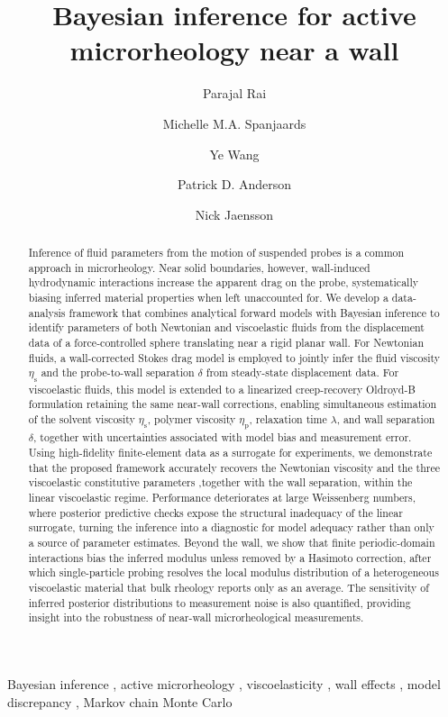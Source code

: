 \documentclass{elsarticle}
\begin{document}
\begin{frontmatter}

\title{Bayesian inference for active microrheology near a wall}

\author[1]{Parajal Rai}
\author[1]{Michelle M.A. Spanjaards}
\author[1]{Ye Wang}
\author[1]{Patrick D. Anderson}
\author[1]{Nick Jaensson}
\address[1]{Department of Mechanical Engineering,
            Eindhoven University of Technology,
            5600 MB Eindhoven, The Netherlands}


\begin{abstract}
Inference of fluid parameters from the motion of suspended probes is a
common approach in microrheology. Near solid boundaries, however,
wall-induced hydrodynamic interactions increase the apparent drag on the
probe, systematically biasing inferred material properties when left
unaccounted for. We develop a data-analysis framework that combines
analytical forward models with Bayesian inference to identify parameters
of both Newtonian and viscoelastic fluids from the displacement data of a
force-controlled sphere translating near a rigid planar wall. For
Newtonian fluids, a wall-corrected Stokes drag model is employed to
jointly infer the fluid viscosity $\eta_{\mathrm{s}}$ and the
probe-to-wall separation $\delta$ from steady-state displacement data.
For viscoelastic fluids, this model is extended to a linearized
creep-recovery Oldroyd-B formulation retaining the same near-wall
corrections, enabling simultaneous estimation of the solvent viscosity
$\eta_{\mathrm{s}}$, polymer viscosity $\eta_{\mathrm{p}}$, relaxation
time $\lambda$, and wall separation $\delta$, together with
uncertainties associated with model bias and measurement error. Using
high-fidelity finite-element data as a surrogate for experiments, we
demonstrate that the proposed framework accurately recovers the
Newtonian viscosity and the three viscoelastic constitutive parameters
,together with the wall separation, within the linear viscoelastic regime. Performance
deteriorates at large Weissenberg numbers, where posterior
predictive checks expose the structural inadequacy of the linear
surrogate, turning the inference into a diagnostic for model adequacy
rather than only a source of parameter estimates. Beyond the wall, we
show that finite periodic-domain interactions bias the inferred modulus
unless removed by a Hasimoto correction, after which single-particle
probing resolves the local modulus distribution of a heterogeneous
viscoelastic material that bulk rheology reports only as an average. The
sensitivity of inferred posterior distributions to
measurement noise is also quantified, providing insight into the
robustness of near-wall microrheological measurements.
\end{abstract}

\begin{keyword}
Bayesian inference \sep
active microrheology \sep
viscoelasticity \sep
wall effects \sep
model discrepancy \sep
Markov chain Monte Carlo
\end{keyword}

\end{frontmatter}
\end{document}

